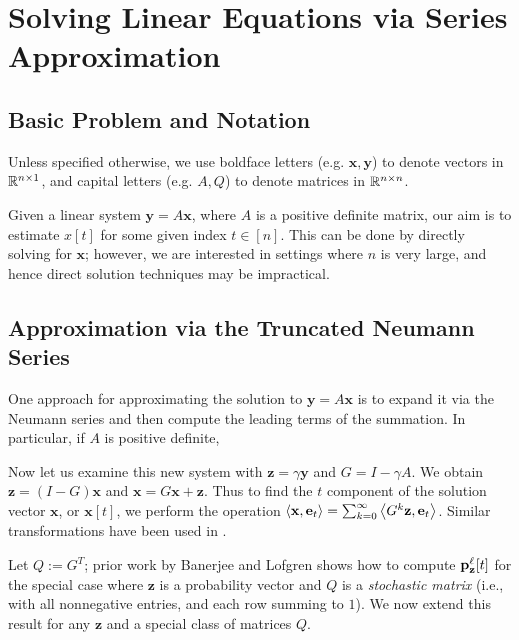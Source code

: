 \section{Solving Linear Equations via Series Approximation}

\subsection{Basic Problem and Notation}

Unless specified otherwise, we use boldface letters (e.g. $\mathbf{x},\mathbf{y}$) to denote vectors in $\mathbb{R}^{n\times 1}$, and capital letters (e.g. $A,Q$) to denote matrices in $\mathbb{R}^{n\times n}$.


Given a linear system $\mathbf{y} = A\mathbf{x}$, where $A$ is a positive definite matrix, our aim is to estimate $x[t]$ for some given index $t\in[n]$. 
This can be done by directly solving for $\mathbf{x}$; however, we are interested in settings where $n$ is very large, and hence direct solution techniques may be impractical. 


\subsection{Approximation via the Truncated Neumann Series}

One approach for approximating the solution to $\mathbf{y} = A\mathbf{x}$ is to expand it via the Neumann series and then compute the leading terms of the summation.
In particular, if $A$ is positive definite, 

Now let us examine this new system with $\mathbf{z} = \gamma \mathbf{y}$ and $G = I - \gamma A$. 
We obtain $\mathbf{z} = (I - G)\mathbf{x}$ and $\mathbf{x} = G\mathbf{x} + \mathbf{z}$. 
Thus to find the $t$ component of the solution vector $\mathbf{x}$, or $\mathbf{x}[t]$, we perform the operation $\left< \mathbf{x}, \mathbf{e}_t \right> = \sum_{k=0}^\infty \left< G^k \mathbf{z}, \mathbf{e}_t \right>$. 
Similar transformations have been used in \cite{dimov2015new, lee2014asynchronous, wu2016multi}.

Let $Q:=G^T$; prior work by Banerjee and Lofgren \cite{banerjee2015fast} shows how to compute ${\mathbf{p}}_\mathbf{z}^{\ell}[t]$ for the special case where $\mathbf{z}$ is a probability vector and $Q$ is a \emph{stochastic matrix} (i.e., with all nonnegative entries, and each row summing to $1$). 
We now extend this result for any $\mathbf{z}$ and a special class of matrices $Q$.

